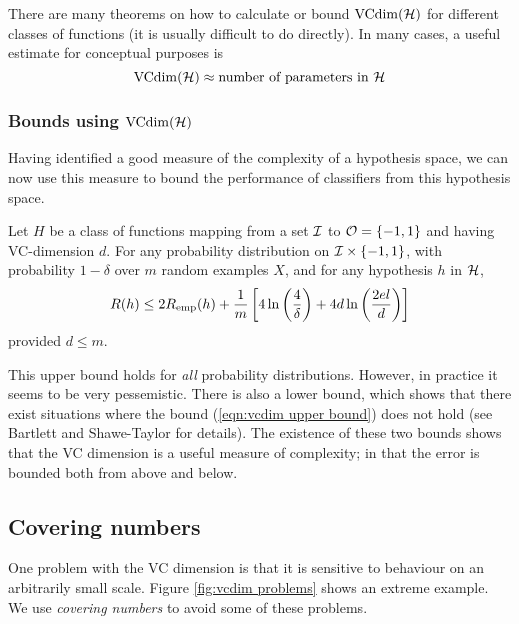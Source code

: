 There are many theorems on how to calculate or bound $\mathrm{VCdim}(\mathcal{H})$ for
different classes of functions (it is usually difficult to do
directly).  In many cases, a useful estimate for conceptual purposes
is
%
\begin{equation}
\mathrm{VCdim}(\mathcal{H}) \approx \mbox{number of parameters in $\mathcal{H}$}
\end{equation}


\subsubsection{Bounds using $\mathrm{VCdim}(\mathcal{H})$}

Having identified a good measure of the complexity of a hypothesis
space, we can now use this measure to bound the performance of
classifiers from this hypothesis space.

\begin{theorem}
Let $H$ be a class of functions mapping from a set $\mathcal{I}$ to $\mathcal{O} =
\{-1, 1\}$ and having VC-dimension $d$.  For any probability
distribution on $\mathcal{I} \times \{-1,1\}$, with probability $1-\delta$
over $m$ random examples $X$, and for any hypothesis $h$ in $\mathcal{H}$,
\begin{equation}
R(h) \leq 2R_{\mathrm{emp}}(h) + \frac{1}{m} \left[ 4 \ln 
\left( \frac{4}{\delta} \right) + 4 d \ln \left( \frac{2 e l}{d}
\right) \right]
\end{equation}
provided $d \leq m$.
\end{theorem}

This upper bound holds for \emph{all} probability distributions.
However, in practice it seems to be very pessemistic.  There is also a
lower bound, which shows that there exist situations where the bound
(\ref{eqn:vcdim upper bound}) does not hold (see Bartlett and
Shawe-Taylor \cite{Bartlett98a} for details).  The existence of these
two bounds shows that the VC dimension is a useful measure of
complexity; in that the error is bounded both from above and below.


\subsection{Covering numbers}
\label{sec:covering numbers}

One problem with the VC dimension is that it is sensitive to behaviour
on an arbitrarily small scale.  Figure \ref{fig:vcdim problems} shows
an extreme example.  We use \emph{covering numbers} to avoid some of
these problems.

